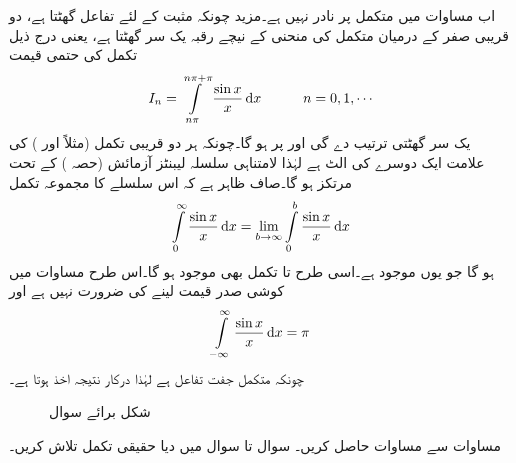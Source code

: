 اب مساوات  میں متکمل  پر نادر  نہیں ہے۔مزید چونکہ مثبت  کے لئے تفاعل  گھٹتا ہے، دو قریبی صفر کے درمیان متکمل کی منحنی کے نیچے رقبہ یک سر گھٹتا ہے، یعنی درج ذیل تکمل کی حتمی قیمت 
\begin{align*}
I_n=\int\limits_{n\pi}^{n\pi+\pi}\frac{\sin x}{x}\dif x\quad\quad \quad n=0,1,\cdots
\end{align*} 
یک سر گھٹتی ترتیب   دے گی اور  پر  ہو گا۔چونکہ ہر دو قریبی تکمل (مثلاً  اور ) کی علامت ایک دوسرے کی الٹ ہے  لہٰذا لامتناہی سلسلہ  لیبنٹز آزمائش (حصہ ) کے تحت مرتکز ہو گا۔صاف ظاہر ہے کہ اس سلسلے کا مجموعہ تکمل
\begin{align*}
\int\limits_0^{\infty} \frac{\sin x}{x}\dif x=\lim_{b\to \infty} \int\limits_{0}^{b}\frac{\sin x}{x}\dif x
\end{align*}
ہو گا جو یوں موجود ہے۔اسی طرح  تا  تکمل بھی موجود ہو گا۔اس طرح  مساوات  میں کوشی صدر قیمت لینے کی ضرورت نہیں ہے اور
\begin{align*}
\int\limits_{-\infty}^{\infty} \frac{\sin x}{x}\dif x=\pi
\end{align*}
چونکہ متکمل  جفت تفاعل ہے لہٰذا درکار نتیجہ اخذ ہوتا ہے۔
\begin{figure}
\centering
{}
\caption{شکل برائے سوال }
\label{شکل_سوال_بقیہ_کوشی_صدر_قیمت_دو_قطب}
\end{figure}
\quad
مساوات  سے مساوات  حاصل کریں۔
سوال  تا سوال  میں دیا حقیقی تکمل تلاش کریں۔

